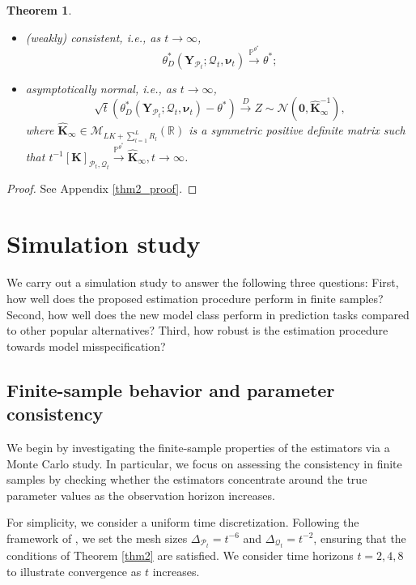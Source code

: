 \documentclass[12pt]{amsart}
\newtheorem{theorem}{Theorem}[section]
\numberwithin{equation}{section}
\newcommand{\1}{\mathbf{1}}
\begin{document}
\begin{theorem}
\begin{itemize}
    \item (weakly) consistent, i.e., as $t\to\infty$,
    \begin{equation*}
    \theta_D^*\left(\mathbf{Y}_{\mathcal{P}_t};\mathcal{Q}_t,\bm{\nu}_t\right)\overset{\mathbb{P}^{\theta^*}}{\longrightarrow}\theta^*;
    \end{equation*}
    \item asymptotically normal, i.e., as $t\to\infty$,
    \begin{equation*}
        \sqrt{t}\left(\theta_{D}^*\left(\mathbf{Y}_{\mathcal{P}_t};\mathcal{Q}_t,\bm{\nu}_t\right)-\theta^*\right)\overset{D}{\longrightarrow}Z\sim \mathcal{N}\left(\mathbf{0},\hat{\mathbf{K}}^{-1}_{\infty}\right),
    \end{equation*}
    where $\hat{\mathbf{K}}_{\infty}\in\mathcal{M}_{LK+\sum_{l=1}^LR_l}(\mathbb{R})$ is a symmetric positive definite matrix such that $t^{-1}[\mathbf{K}]_{\mathcal{P}_t,\mathcal{Q}_t}\overset{\mathbb{P}^{\theta^*}}{\longrightarrow}\hat{\mathbf{K}}_{\infty}, t\to\infty$.
\end{itemize}
\end{theorem}
\begin{proof}
    See Appendix \ref{thm2_proof}.
\end{proof}

\section{Simulation study}
\label{Simulation study}
We carry out a simulation study to answer the following three questions: First, how well does the proposed estimation procedure perform in finite samples? Second, how well does the new model class perform in prediction tasks compared to other popular alternatives? Third, how robust is the estimation procedure towards model misspecification?

\subsection{Finite-sample behavior and parameter consistency} We begin by investigating the finite-sample properties of the estimators via a Monte Carlo study. In particular, we focus on assessing the consistency in finite samples by checking whether the estimators concentrate around the true parameter values as the observation horizon increases.

For simplicity, we consider a uniform time discretization. Following the framework of \cite[Section 4.4]{lucchese2026estimation}, we set the mesh sizes $\Delta_{\mathcal{P}_t} = t^{-6}$ and $\Delta_{\mathcal{Q}_t} = t^{-2}$, ensuring that the conditions of Theorem \ref{thm2} are satisfied. We consider time horizons $t = 2, 4, 8$ to illustrate convergence as $t$ increases.
\end{document}
